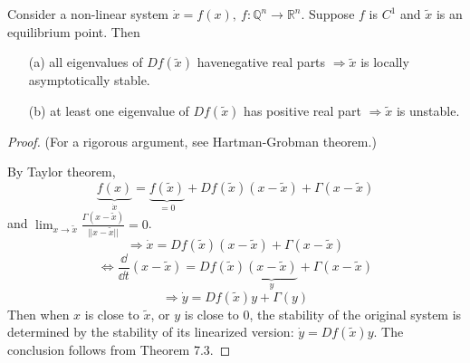 \documentclass[twoside]{article}
\newcommand\imp{$\Longrightarrow$}
\begin{document}
\begin{theorem}
    Consider a non-linear system $\dot{x} = f(x), ~ f : \mathbb{Q}^{n} \to \mathbb{R}^{n}$. Suppose $f$ is $C^{1}$ and $\tilde{x}$ is an equilibrium point. Then
    \begin{itemize}
        \item [(a)] all eigenvalues of $Df(\tilde{x})$ havenegative real parts \imp $\tilde{x}$ is locally asymptotically stable.
        \item [(b)] at least one eigenvalue of  $Df(\tilde{x})$ has positive real part \imp $\tilde{x}$ is unstable.
    \end{itemize}
\end{theorem}
\begin{proof}
    (For a rigorous argument, see Hartman-Grobman theorem.)

    By Taylor theorem,
    \[
    \underbrace{f(x)}_{\dot{x}} = \underbrace{f(\tilde{x})}_{=0}+ Df(\tilde{x})(x-\tilde{x}) + \Gamma (x - \tilde{x})
    \]
    and $\lim_{x\to \tilde{x}} \frac{\Gamma (x - \tilde{x})}{||x - \tilde{x}||} = 0$.
    \[
    \Longrightarrow \dot{x} = D f (\tilde{x}) (x- \tilde{x}) + \Gamma (x-\tilde{x})
    \]
    \[
    \iff \frac{\dd}{\dd t}(x - \tilde{x}) = Df(\tilde{x})\underbrace{(x-\tilde{x})}_{y} + \Gamma (x- \tilde{x})
    \]
    \[
    \Longrightarrow \dot{y} = D f(\tilde{x}) y + \Gamma (y)
    \]
    Then when $x$ is close to $\tilde{x}$, or $y $ is close to $0$, the stability of the original system is determined by the stability of its linearized version: $\dot{y} = Df(\tilde{x})y$. The conclusion follows from Theorem 7.3.
\end{proof}
\end{document}
